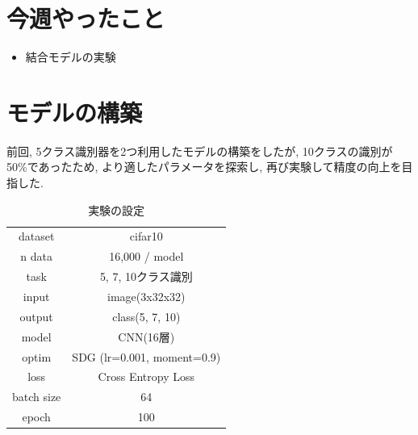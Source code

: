\documentclass[twocolumn]{jarticle}     %
\begin{document}


\section{今週やったこと}
\begin{itemize}
	\item {結合モデルの実験}
\end{itemize}


\section{モデルの構築}
前回, 5クラス識別器を2つ利用したモデルの構築をしたが, 10クラスの識別が50\%であったため, より適したパラメータを探索し, 再び実験して精度の向上を目指した.

\begin{table}[tb]
  \begin{center}
    \caption{実験の設定}
    \begin{tabular}{|c|c|} \hline
      dataset & cifar10 \\
      n data & 16,000 / model \\ \hline
      task & 5, 7, 10クラス識別 \\
      input & image(3x32x32) \\
      output & class(5, 7, 10) \\ \hline
      model & CNN(16層) \\
      optim & SDG (lr=0.001, moment=0.9) \\
      loss & Cross Entropy Loss \\ \hline
      batch size & 64 \\
      epoch & 100 \\ \hline
    \end{tabular}
    \label{tab:setting}
  \end{center}
\end{table}
\end{document}
